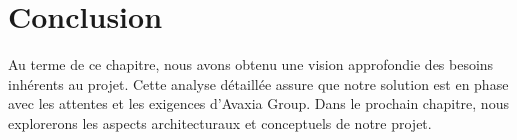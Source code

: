\vspace{-1cm}
\section*{Conclusion}
 Au terme de ce chapitre, nous avons obtenu une vision approfondie des besoins inhérents au projet. Cette analyse détaillée assure que notre solution est en phase avec les attentes et les exigences d'Avaxia Group. Dans le prochain chapitre, nous explorerons les aspects architecturaux et conceptuels de notre projet.